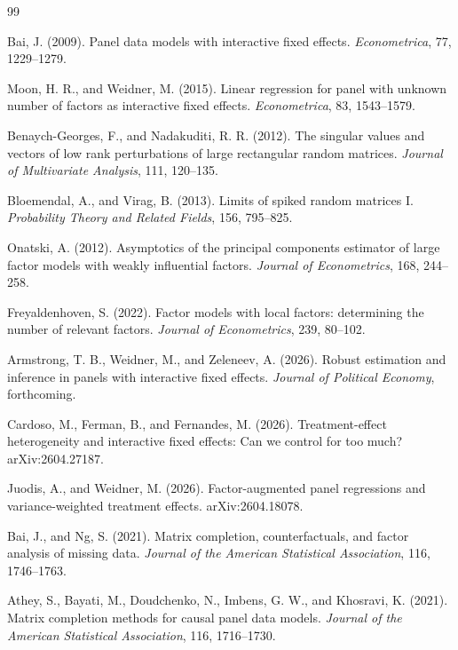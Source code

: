 \documentclass{article}
\begin{document}
\begin{thebibliography}{99}

   Bai, J. (2009). Panel data models with interactive fixed effects. \emph{Econometrica}, 77, 1229--1279.

   Moon, H. R., and Weidner, M. (2015). Linear regression for panel with unknown number of factors as interactive fixed effects. \emph{Econometrica}, 83, 1543--1579.

   Benaych-Georges, F., and Nadakuditi, R. R. (2012). The singular values and vectors of low rank perturbations of large rectangular random matrices. \emph{Journal of Multivariate Analysis}, 111, 120--135.

   Bloemendal, A., and Virag, B. (2013). Limits of spiked random matrices I. \emph{Probability Theory and Related Fields}, 156, 795--825.

   Onatski, A. (2012). Asymptotics of the principal components estimator of large factor models with weakly influential factors. \emph{Journal of Econometrics}, 168, 244--258.

   Freyaldenhoven, S. (2022). Factor models with local factors: determining the number of relevant factors. \emph{Journal of Econometrics}, 239, 80--102.

   Armstrong, T. B., Weidner, M., and Zeleneev, A. (2026). Robust estimation and inference in panels with interactive fixed effects. \emph{Journal of Political Economy}, forthcoming.

   Cardoso, M., Ferman, B., and Fernandes, M. (2026). Treatment-effect heterogeneity and interactive fixed effects: Can we control for too much? arXiv:2604.27187.

   Juodis, A., and Weidner, M. (2026). Factor-augmented panel regressions and variance-weighted treatment effects. arXiv:2604.18078.

   Bai, J., and Ng, S. (2021). Matrix completion, counterfactuals, and factor analysis of missing data. \emph{Journal of the American Statistical Association}, 116, 1746--1763.

   Athey, S., Bayati, M., Doudchenko, N., Imbens, G. W., and Khosravi, K. (2021). Matrix completion methods for causal panel data models. \emph{Journal of the American Statistical Association}, 116, 1716--1730.


\end{thebibliography}
\end{document}
